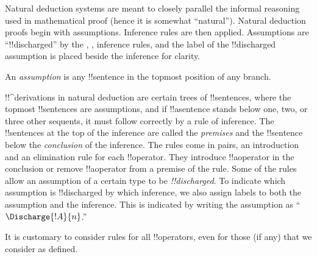 \documentclass[../../../include/open-logic-section]{subfiles}
\begin{document}
      {}
      {}


\begin{explain}
Natural deduction systems are meant to closely parallel the informal
reasoning used in mathematical proof (hence it is somewhat
``natural''). Natural deduction proofs begin with assumptions.
Inference rules are then applied. Assumptions are ``!!{discharged}''
by the \Intro{\lnot}, \Intro{\lif},  inference rules, and the label of
the !!{discharged} assumption is placed beside the inference for
clarity.
\end{explain}

\begin{defn}[Assumption]
An \emph{assumption} is any !!{sentence}
in the topmost position of any branch.
\end{defn}

!!^{derivation}s in natural deduction are certain trees of
!!{sentence}s, where the topmost !!{sentence}s are assumptions, and if
!!a{sentence} stands below one, two, or three other sequents, it must
follow correctly by a rule of inference. The !!{sentence}s at the top
of the inference are called the \emph{premises} and the !!{sentence}
below the \emph{conclusion} of the inference.  The rules come in
pairs, an introduction and an elimination rule for each
!!{operator}. They introduce !!a{operator} in the conclusion or
remove !!a{operator} from a premise of the rule.  Some of the rules
allow an assumption of a certain type to be \emph{!!{discharged}}. To
indicate which assumption is !!{discharged} by which inference, we
also assign labels to both the assumption and the inference.  This is
indicated by writing the assumption as ``$\Discharge{!A}{n}$.''

It is customary to consider rules for all !!{operator}s, even for
those (if any) that we consider as defined.
\end{document}
